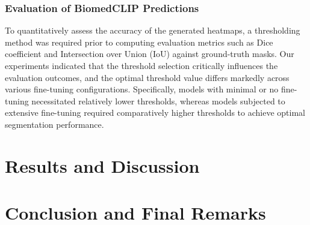 \documentclass[./dissertation.tex]{subfiles}
\begin{document}
\subsubsection{Evaluation of BiomedCLIP Predictions}

To quantitatively assess the accuracy of the generated heatmaps, a thresholding method was required prior to computing evaluation metrics such as Dice coefficient and Intersection over Union (IoU) against ground-truth masks. Our experiments indicated that the threshold selection critically influences the evaluation outcomes, and the optimal threshold value differs markedly across various fine-tuning configurations. Specifically, models with minimal or no fine-tuning necessitated relatively lower thresholds, whereas models subjected to extensive fine-tuning required comparatively higher thresholds to achieve optimal segmentation performance.


\section{Results and Discussion}



\section{Conclusion and Final Remarks}
\end{document}
